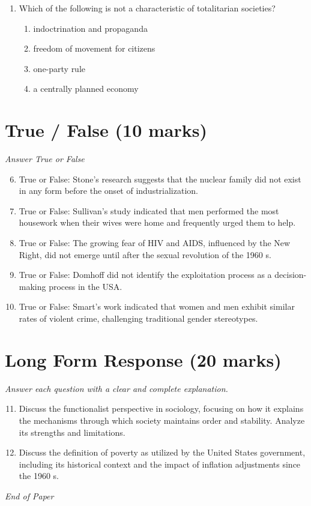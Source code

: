 \documentclass[12pt]{article}
\begin{document}
\begin{enumerate}[label=\arabic*.]
\begin{enumerate}[label=(\alph*)]
    \item If all of your friends jumped off a bridge, I suppose you would too.
    \item You should be proud to be a part of this organization.
    \item If the door is closed, try the window.
    \item Once a thief, always a thief.
\end{enumerate}
\item Which of the following is not a characteristic of totalitarian societies?
\begin{enumerate}[label=(\alph*)]
    \item indoctrination and propaganda
    \item freedom of movement for citizens
    \item one-party rule
    \item a centrally planned economy
\end{enumerate}
\end{enumerate}

\section*{True / False (10 marks)}
\textit{Answer True or False}
\begin{enumerate}[label=\arabic*.]
\setcounter{enumi}{5}
\item True or False: Stone's research suggests that the nuclear family did not exist in any form before the onset of industrialization.
\item True or False: Sullivan's study indicated that men performed the most housework when their wives were home and frequently urged them to help.
\item True or False: The growing fear of HIV and AIDS, influenced by the New Right, did not emerge until after the sexual revolution of the 1960 s.
\item True or False: Domhoff did not identify the exploitation process as a decision-making process in the USA.
\item True or False: Smart's work indicated that women and men exhibit similar rates of violent crime, challenging traditional gender stereotypes.
\end{enumerate}

\section*{Long Form Response (20 marks)}
\textit{Answer each question with a clear and complete explanation.}
\begin{enumerate}[label=\arabic*.]
\setcounter{enumi}{10}
\item Discuss the functionalist perspective in sociology, focusing on how it explains the mechanisms through which society maintains order and stability. Analyze its strengths and limitations.
\item Discuss the definition of poverty as utilized by the United States government, including its historical context and the impact of inflation adjustments since the 1960 s.
\end{enumerate}

\vfill
\noindent\textit{End of Paper}
\end{document}

